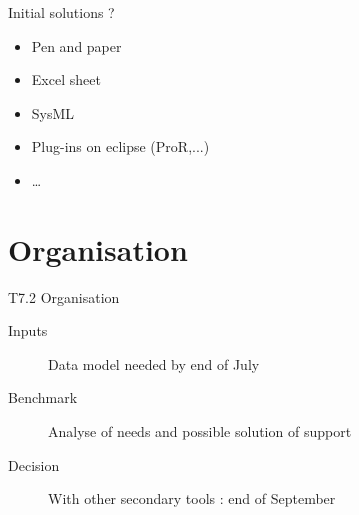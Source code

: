 \begin{frame}{Initial solutions ?}

  \begin{itemize}
  \item
    Pen and paper
  \item
    Excel sheet
  \item 
  	SysML
  \item
  	Plug-ins on eclipse (ProR,...)
  \item 
  	\dots
  \end{itemize}
  
\end{frame}


\section{Organisation}



\begin{frame}{T7.2 Organisation}

\begin{description}
\item[Inputs] Data model needed by end of July
\item[Benchmark] Analyse of needs and possible solution of support
\item[Decision] With other secondary tools :  end of September
\end{description}
  
\end{frame}